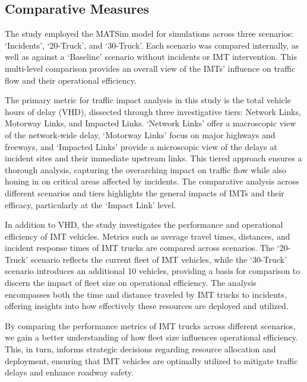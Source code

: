 \documentclass[fancy, oneside, mastersfancy, ms]{byuthesis}
\begin{document}
\hypertarget{comparative-measures}{%
\subsection{Comparative Measures}\label{comparative-measures}}

The study employed the MATSim model for simulations across three
scenarios: `Incidents', `20-Truck', and `30-Truck'. Each scenario was
compared internally, as well as against a `Baseline' scenario without
incidents or IMT intervention. This multi-level comparison provides an
overall view of the IMTs' influence on traffic flow and their
operational efficiency.

The primary metric for traffic impact analysis in this study is the
total vehicle hours of delay (VHD), dissected through three
investigative tiers: Network Links, Motorway Links, and Impacted Links.
`Network Links' offer a macroscopic view of the network-wide delay,
`Motorway Links' focus on major highways and freeways, and `Impacted
Links' provide a microscopic view of the delays at incident sites and
their immediate upstream links. This tiered approach ensures a thorough
analysis, capturing the overarching impact on traffic flow while also
honing in on critical areas affected by incidents. The comparative
analysis across different scenarios and tiers highlights the general
impacts of IMTs and their efficacy, particularly at the `Impact Link'
level.

In addition to VHD, the study investigates the performance and
operational efficiency of IMT vehicles. Metrics such as average travel
times, distances, and incident response times of IMT trucks are compared
across scenarios. The `20-Truck' scenario reflects the current fleet of
IMT vehicles, while the `30-Truck' scenario introduces an additional 10
vehicles, providing a basis for comparison to discern the impact of
fleet size on operational efficiency. The analysis encompasses both the
time and distance traveled by IMT trucks to incidents, offering insights
into how effectively these resources are deployed and utilized.

By comparing the performance metrics of IMT trucks across different
scenarios, we gain a better understanding of how fleet size influences
operational efficiency. This, in turn, informs strategic decisions
regarding resource allocation and deployment, ensuring that IMT vehicles
are optimally utilized to mitigate traffic delays and enhance roadway
safety.

\end{document}
